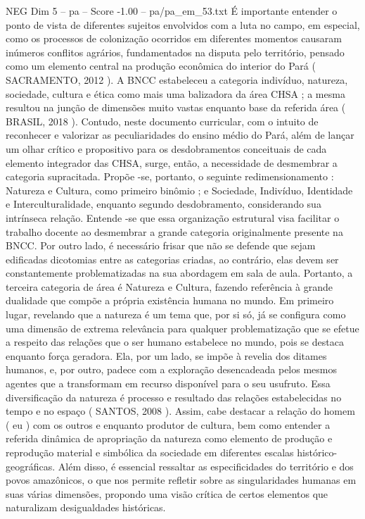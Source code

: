 \begin{textsample}{NEG Dim 5 – pa – Score -1.00 – pa/pa\_em\_53.txt}
É importante entender o ponto de vista de diferentes sujeitos envolvidos com a luta no campo, em especial, como os processos de colonização ocorridos em diferentes momentos causaram inúmeros conflitos agrários, fundamentados na disputa pelo território, pensado como um elemento central na produção econômica do interior do Pará ( SACRAMENTO, 2012 ).
A BNCC estabeleceu a categoria indivíduo, natureza, sociedade, cultura e ética como mais uma balizadora da área CHSA ; a mesma resultou na junção de dimensões muito vastas enquanto base da referida área ( BRASIL, 2018 ).
Contudo, neste documento curricular, com o intuito de reconhecer e valorizar as peculiaridades do ensino médio do Pará, além de lançar um olhar crítico e propositivo para os desdobramentos conceituais de cada elemento integrador das CHSA, surge, então, a necessidade de desmembrar a categoria supracitada.
Propõe -se, portanto, o seguinte redimensionamento : Natureza e Cultura, como primeiro binômio ; e Sociedade, Indivíduo, Identidade e Interculturalidade, enquanto segundo desdobramento, considerando sua intrínseca relação.
Entende -se que essa organização estrutural visa facilitar o trabalho docente ao desmembrar a grande categoria originalmente presente na BNCC.
Por outro lado, é necessário frisar que não se defende que sejam edificadas dicotomias entre as categorias criadas, ao contrário, elas devem ser constantemente problematizadas na sua abordagem em sala de aula.
Portanto, a terceira categoria de área é Natureza e Cultura, fazendo referência à grande dualidade que compõe a própria existência humana no mundo.
Em primeiro lugar, revelando que a natureza é um tema que, por si só, já se configura como uma dimensão de extrema relevância para qualquer problematização que se efetue a respeito das relações que o ser humano estabelece no mundo, pois se destaca enquanto força geradora.
Ela, por um lado, se impõe à revelia dos ditames humanos, e, por outro, padece com a exploração desencadeada pelos mesmos agentes que a transformam em recurso disponível para o seu usufruto.
Essa diversificação da natureza é processo e resultado das relações estabelecidas no tempo e no espaço ( SANTOS, 2008 ).
Assim, cabe destacar a relação do homem ( eu ) com os outros e enquanto produtor de cultura, bem como entender a referida dinâmica de apropriação da natureza como elemento de produção e reprodução material e simbólica da sociedade em diferentes escalas histórico-geográficas.
Além disso, é essencial ressaltar as especificidades do território e dos povos amazônicos, o que nos permite refletir sobre as singularidades humanas em suas várias dimensões, propondo uma visão crítica de certos elementos que naturalizam desigualdades históricas.

\end{textsample}
